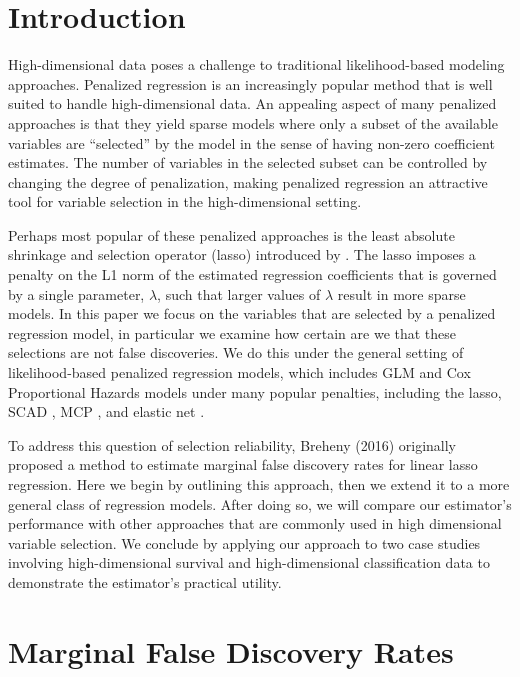 \section{Introduction}

High-dimensional data poses a challenge to traditional likelihood-based modeling approaches.  Penalized regression is an increasingly popular method that is well suited to handle high-dimensional data.  An appealing aspect of many penalized approaches is that they yield sparse models where only a subset of the available variables are ``selected'' by the model in the sense of having non-zero coefficient estimates.  The number of variables in the selected subset can be controlled by changing the degree of penalization, making penalized regression an attractive tool for variable selection in the high-dimensional setting.

Perhaps most popular of these penalized approaches is the least absolute shrinkage and selection operator (lasso) introduced by \citet{tibshirani_1996}. The lasso imposes a penalty on the L1 norm of the estimated regression coefficients that is governed by a single parameter, $\lambda$, such that larger values of $\lambda$ result in more sparse models. In this paper we focus on the variables that are selected by a penalized regression model, in particular we examine how certain are we that these selections are not false discoveries. We do this under the general setting of likelihood-based penalized regression models, which includes GLM and Cox Proportional Hazards models under many popular penalties, including the lasso, SCAD \citep{SCAD}, MCP \citep{MCP}, and elastic net \citep{Elastic_Net}.

To address this question of selection reliability, Breheny (2016) originally proposed a method to estimate marginal false discovery rates for linear lasso regression. Here we begin by outlining this approach, then we extend it to a more general class of regression models.  After doing so, we will compare our estimator's performance with other approaches that are commonly used in high dimensional variable selection.  We conclude by applying our approach to two case studies involving high-dimensional survival and high-dimensional classification data to demonstrate the estimator's practical utility.

\section{Marginal False Discovery Rates}

